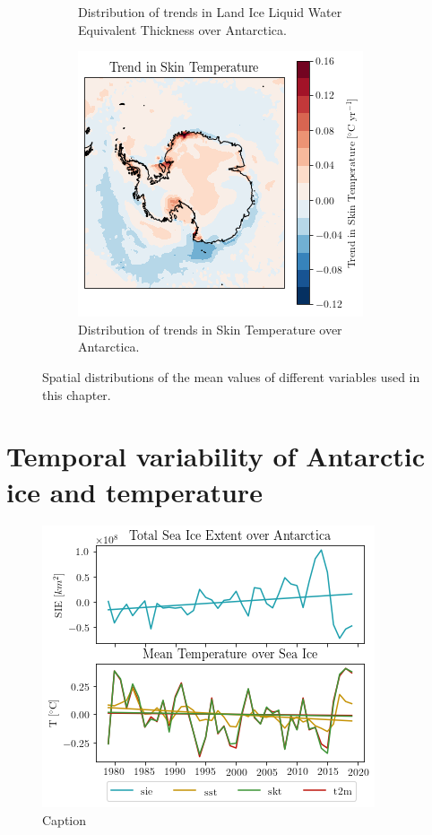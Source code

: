 \documentclass[../main.tex]{subfiles}
\begin{document}
\begin{figure}[H]
\begin{subfigure}[h!]{0.49\textwidth}
\caption{Distribution of trends in Land Ice Liquid Water Equivalent Thickness over Antarctica.}
\end{subfigure}
\begin{subfigure}[h!]{0.49\textwidth}
\includegraphics[width=\textwidth]{images/week8/lres/trend_skt_distribution}
\caption{Distribution of trends in Skin Temperature over Antarctica.}
\end{subfigure}
\caption{Spatial distributions of the mean values of different variables used in this chapter.}
\label{fig:trend_distributions}
\end{figure}

\section{Temporal variability of Antarctic ice and temperature}

\begin{figure}[H]
    \centering
    \includegraphics{images/week8/lres/seaice_temperature_timeseries}
    \caption{Caption}
    \label{fig:my_label}
\end{figure}
\end{document}
